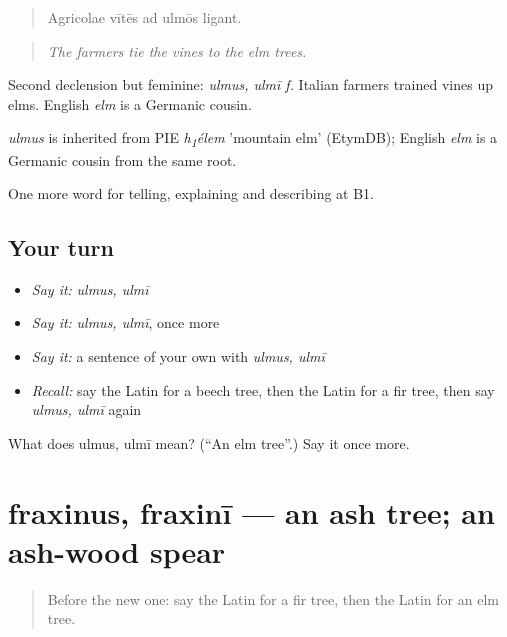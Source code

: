 \begin{quote}
Agricolae vītēs ad ulmōs ligant.
\end{quote}

\begin{quote}
\emph{The farmers tie the vines to the elm trees.}
\end{quote}

Second declension but feminine: \emph{ulmus, ulmī f.} Italian farmers trained vines up elms. English \emph{elm} is a Germanic cousin.

\begin{cousinweb}
\emph{ulmus} is inherited from PIE \emph{h\textsubscript{1}élem} 'mountain elm' (EtymDB); English \emph{elm} is a Germanic cousin from the same root.
\end{cousinweb}

\begin{grammarlens}[title={What you've built}]
One more word for telling, explaining and describing at B1.
\end{grammarlens}

\subsection*{Your turn}
\begin{itemize}
\raggedright
  \item \emph{Say it:} \emph{ulmus, ulmī}
  \item \emph{Say it:} \emph{ulmus, ulmī}, once more
  \item \emph{Say it:} a sentence of your own with \emph{ulmus, ulmī}
  \item \emph{Recall:} say the Latin for a beech tree, then the Latin for a fir tree, then say \emph{ulmus, ulmī} again
\end{itemize}

\begin{tcolorbox}[breakable,colback=teal!4,colframe=teal!35!black,title={Before you move on}]
What does ulmus, ulmī mean? (\textquotedblleft{}An elm tree\textquotedblright{}.) Say it once more.
\end{tcolorbox}
\section[fraxinus, fraxinī]{fraxinus, fraxinī — an ash tree; an ash-wood spear}

\label{lesson:LA-C484-fraxinus}



\begin{quote}
Before the new one: say the Latin for a fir tree, then the Latin for an elm tree.
\end{quote}

